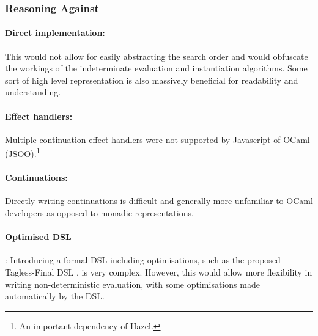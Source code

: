 \subsubsection{Reasoning Against}
\paragraph{Direct implementation:} This would not allow for easily abstracting the search order and would obfuscate the workings of the indeterminate evaluation and instantiation algorithms. Some sort of high level representation is also massively beneficial for readability and understanding.
\paragraph{Effect handlers:} Multiple continuation effect handlers were not supported by Javascript of OCaml (JSOO).\footnote{An important dependency of Hazel.} 
\paragraph{Continuations:} Directly writing continuations is difficult and generally more unfamiliar to OCaml developers as opposed to monadic representations.
\paragraph{Optimised DSL}: Introducing a formal DSL including optimisations, such as the proposed Tagless-Final DSL \cite{TaglessFinalDSL, NondetDSL}, is very complex. However, this would allow more flexibility in writing non-deterministic evaluation, with some optimisations made automatically by the DSL.